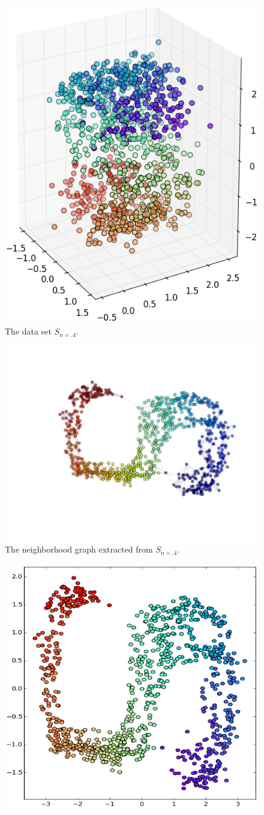 \documentclass[12pt]{article}
\begin{document}
\begin{description}
	\begin{figure}[H]
		\centering
		\includegraphics[width=.6\linewidth]{img/noise/s/5_0_20-original.png}
		\captionsetup{justification=centering}
		\caption{The data set $S_{n=.4}$.}
	\end{figure}
	\begin{figure}[H]
		\centering
	    \includegraphics[width=.8\linewidth]{img/noise/s/5_0_20-graph}
		\captionsetup{justification=centering}
		\caption{The neighborhood graph extracted from $S_{n=.4}$.}
	\end{figure}
	\begin{figure}[H]
		\centering
	    \includegraphics[width=.6\linewidth]{img/noise/s/5_0_20-reduced}

\end{figure}
\end{description}
\end{document}
